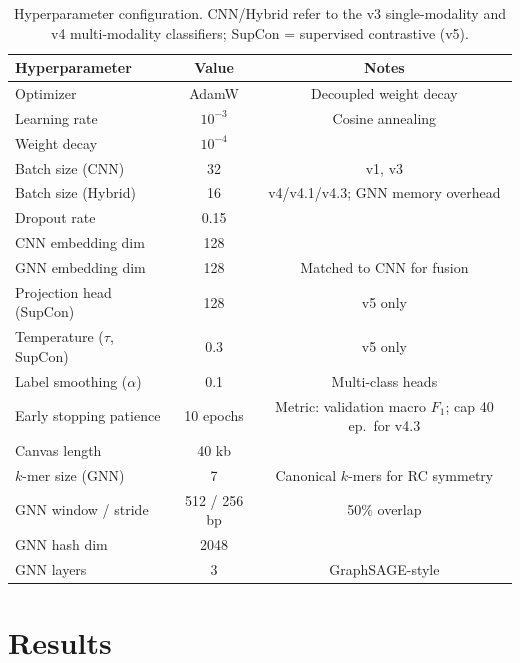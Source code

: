 \documentclass[12pt]{article}
\begin{document}
\begin{table}[h]
\centering
\caption{Hyperparameter configuration. CNN/Hybrid refer to the v3 single-modality and v4 multi-modality classifiers; SupCon = supervised contrastive (v5).}
\label{tab:hyperparams}
\begin{tabular}{lcc}
\hline
Hyperparameter & Value & Notes \\
\hline
Optimizer & AdamW & Decoupled weight decay \\
Learning rate & $10^{-3}$ & Cosine annealing \\
Weight decay & $10^{-4}$ & \\
Batch size (CNN) & 32 & v1, v3 \\
Batch size (Hybrid) & 16 & v4/v4.1/v4.3; GNN memory overhead \\
Dropout rate & 0.15 & \\
CNN embedding dim & 128 & \\
GNN embedding dim & 128 & Matched to CNN for fusion \\
Projection head (SupCon) & 128 & v5 only \\
Temperature ($\tau$, SupCon) & 0.3 & v5 only \cite{khosla2020supervised} \\
Label smoothing ($\alpha$) & 0.1 & Multi-class heads \\
Early stopping patience & 10 epochs & Metric: validation macro $F_1$; cap 40 ep.~for v4.3 \\
Canvas length & 40 kb & \\
$k$-mer size (GNN) & 7 & Canonical $k$-mers for RC symmetry \\
GNN window / stride & 512 / 256 bp & 50\% overlap \\
GNN hash dim & 2048 & \\
GNN layers & 3 & GraphSAGE-style \\
\hline
\end{tabular}
\end{table}

\clearpage
\section{Results}\label{sec:results}
\end{document}
